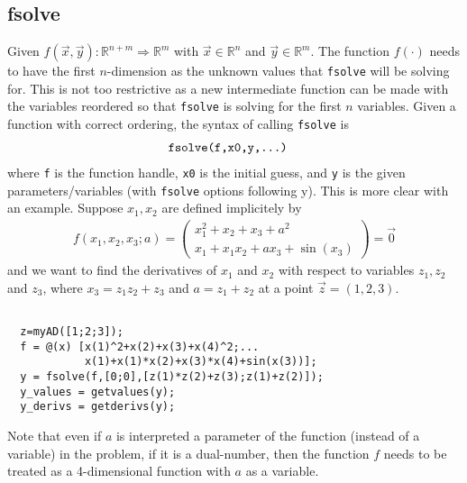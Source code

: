 \documentclass{amsart}
\begin{document}
\subsection{fsolve}
Given $f(\vec{x},\vec{y}): \mathbb{R}^{n+m}\Rightarrow \mathbb{R}^m$ with $\vec{x}\in \mathbb{R}^n$ and $\vec{y}\in \mathbb{R}^m$. The function $f(\cdot)$ needs to have the first $n$-dimension as the unknown values that \texttt{fsolve} will be solving for. This is not too restrictive as a new intermediate function can be made with the variables reordered so that \texttt{fsolve} is solving for the first $n$ variables. Given a function with correct ordering, the syntax of calling \texttt{fsolve} is
\begin{align*}
&\text{\texttt{fsolve(f,x0,y,...)}}
\end{align*}
where \texttt{f} is the function handle, \texttt{x0} is the initial guess, and \texttt{y} is the given parameters/variables (with \texttt{fsolve} options following y). This is more clear with an example. Suppose $x_1, x_2$ are defined implicitely by  
\begin{align*}
  f(x_1,x_2,x_3;a)=\left(\begin{array}{c} x_1^2+x_2+x_3+a^2\\ x_1+x_1x_2+ax_3+\sin(x_3)\end{array}\right)=\vec{0}
\end{align*}
and we want to find the derivatives of $x_1$ and $x_2$ with respect to variables $z_1, z_2$ and $z_3$, where $x_3=z_1z_2+z_3$ and $a=z_1+z_2$ at a point $\vec{z}=(1,2,3)$.
\begin{verbatim}

  z=myAD([1;2;3]);
  f = @(x) [x(1)^2+x(2)+x(3)+x(4)^2;...
            x(1)+x(1)*x(2)+x(3)*x(4)+sin(x(3))];
  y = fsolve(f,[0;0],[z(1)*z(2)+z(3);z(1)+z(2)]);
  y_values = getvalues(y);
  y_derivs = getderivs(y);

\end{verbatim}
Note that even if $a$ is interpreted a parameter of the function (instead of a variable) in the problem, if it is a dual-number, then the function $f$ needs to be treated as a 4-dimensional function with $a$ as a variable.
\end{document}
